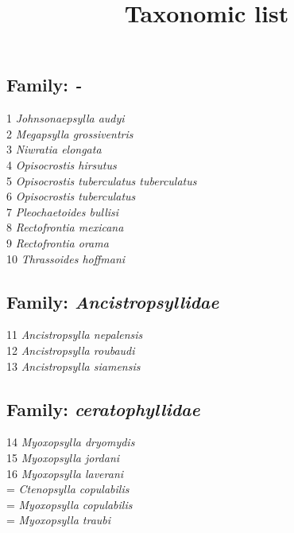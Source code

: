 \documentclass[
]{article}
\title{Taxonomic list}
\author{}
\date{\vspace{-2.5em}}
\begin{document}
\maketitle

\hypertarget{family--}{%
\subsection{\texorpdfstring{Family:
\emph{-}}{Family: -}}\label{family--}}

1 \emph{Johnsonaepsylla audyi}\\
2 \emph{Megapsylla grossiventris}\\
3 \emph{Niwratia elongata}\\
4 \emph{Opisocrostis hirsutus}\\
5 \emph{Opisocrostis tuberculatus tuberculatus}\\
6 \emph{Opisocrostis tuberculatus}\\
7 \emph{Pleochaetoides bullisi}\\
8 \emph{Rectofrontia mexicana}\\
9 \emph{Rectofrontia orama}\\
10 \emph{Thrassoides hoffmani}

\hypertarget{family-ancistropsyllidae}{%
\subsection{\texorpdfstring{Family:
\emph{Ancistropsyllidae}}{Family: Ancistropsyllidae}}\label{family-ancistropsyllidae}}

11 \emph{Ancistropsylla nepalensis}\\
12 \emph{Ancistropsylla roubaudi}\\
13 \emph{Ancistropsylla siamensis}

\hypertarget{family-ceratophyllidae}{%
\subsection{\texorpdfstring{Family:
\emph{ceratophyllidae}}{Family: ceratophyllidae}}\label{family-ceratophyllidae}}

14 \emph{Myoxopsylla dryomydis}\\
15 \emph{Myoxopsylla jordani}\\
16 \emph{Myoxopsylla laverani}\\
= \emph{Ctenopsylla copulabilis}\\
= \emph{Myoxopsylla copulabilis}\\
= \emph{Myoxopsylla traubi}
\end{document}
